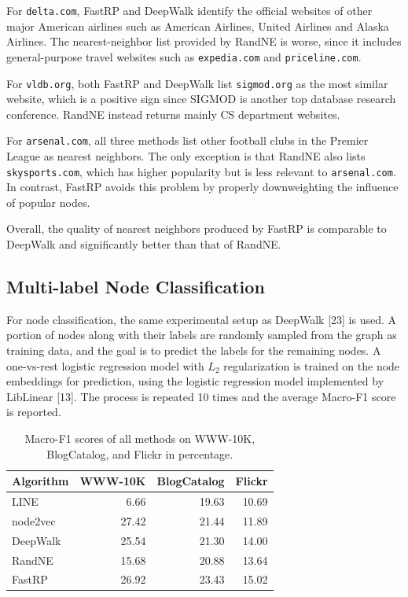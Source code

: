 \documentclass[11pt]{article}
\begin{document}
For \texttt{delta.com}, FastRP and DeepWalk identify the official websites of other major American airlines such as American Airlines, United Airlines and Alaska Airlines. The nearest-neighbor list provided by RandNE is worse, since it includes general-purpose travel websites such as \texttt{expedia.com} and \texttt{priceline.com}.

For \texttt{vldb.org}, both FastRP and DeepWalk list \texttt{sigmod.org} as the most similar website, which is a positive sign since SIGMOD is another top database research conference. RandNE instead returns mainly CS department websites.

For \texttt{arsenal.com}, all three methods list other football clubs in the Premier League as nearest neighbors. The only exception is that RandNE also lists \texttt{skysports.com}, which has higher popularity but is less relevant to \texttt{arsenal.com}. In contrast, FastRP avoids this problem by properly downweighting the influence of popular nodes.

Overall, the quality of nearest neighbors produced by FastRP is comparable to DeepWalk and significantly better than that of RandNE.

\subsection{Multi-label Node Classification}

For node classification, the same experimental setup as DeepWalk [23] is used. A portion of nodes along with their labels are randomly sampled from the graph as training data, and the goal is to predict the labels for the remaining nodes. A one-vs-rest logistic regression model with $L_2$ regularization is trained on the node embeddings for prediction, using the logistic regression model implemented by LibLinear [13]. The process is repeated 10 times and the average Macro-F1 score is reported.

\begin{table}[H]
\centering
\caption{Macro-F1 scores of all methods on WWW-10K, BlogCatalog, and Flickr in percentage.}
\label{tab:f1}
\begin{tabular}{@{}lrrr@{}}
\toprule
Algorithm & WWW-10K & BlogCatalog & Flickr \\
\midrule
LINE & 6.66 & 19.63 & 10.69 \\
node2vec & 27.42 & 21.44 & 11.89 \\
DeepWalk & 25.54 & 21.30 & 14.00 \\
RandNE & 15.68 & 20.88 & 13.64 \\
FastRP & 26.92 & 23.43 & 15.02 \\
\bottomrule
\end{tabular}
\end{table}
\end{document}
